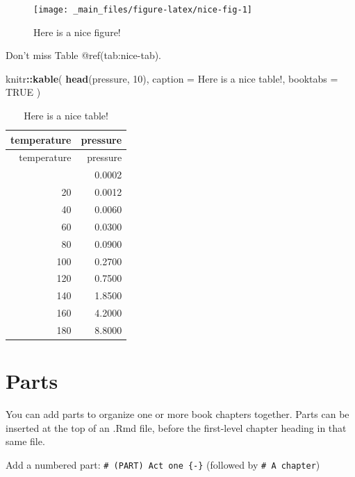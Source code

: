 \documentclass[
]{book}
\newenvironment{Shaded}{\begin{snugshade}}{\end{snugshade}}
\newcommand{\AttributeTok}[1]{\textcolor[rgb]{0.13,0.29,0.53}{#1}}
\newcommand{\ConstantTok}[1]{\textcolor[rgb]{0.56,0.35,0.01}{#1}}
\newcommand{\DecValTok}[1]{\textcolor[rgb]{0.00,0.00,0.81}{#1}}
\newcommand{\FunctionTok}[1]{\textcolor[rgb]{0.13,0.29,0.53}{\textbf{#1}}}
\newcommand{\NormalTok}[1]{#1}
\newcommand{\SpecialCharTok}[1]{\textcolor[rgb]{0.81,0.36,0.00}{\textbf{#1}}}
\newcommand{\StringTok}[1]{\textcolor[rgb]{0.31,0.60,0.02}{#1}}
\begin{document}
\begin{figure}

{\centering \texttt{[image: \_main\_files/figure-latex/nice-fig-1]} 

}

\caption{Here is a nice figure!}\label{fig:nice-fig}
\end{figure}

Don't miss Table @ref(tab:nice-tab).

\begin{Shaded}
\begin{Highlighting}[]
\NormalTok{knitr}\SpecialCharTok{::}\FunctionTok{kable}\NormalTok{(}
  \FunctionTok{head}\NormalTok{(pressure, }\DecValTok{10}\NormalTok{), }\AttributeTok{caption =} \StringTok{\textquotesingle{}Here is a nice table!\textquotesingle{}}\NormalTok{,}
  \AttributeTok{booktabs =} \ConstantTok{TRUE}
\NormalTok{)}
\end{Highlighting}
\end{Shaded}

\begin{longtable}[]{@{}rr@{}}
\caption{Here is a nice table!}\tabularnewline
\toprule\noalign{}
temperature & pressure \\
\midrule\noalign{}
\endfirsthead
\toprule\noalign{}
temperature & pressure \\
\midrule\noalign{}
\endhead
\bottomrule\noalign{}
\endlastfoot
0 & 0.0002 \\
20 & 0.0012 \\
40 & 0.0060 \\
60 & 0.0300 \\
80 & 0.0900 \\
100 & 0.2700 \\
120 & 0.7500 \\
140 & 1.8500 \\
160 & 4.2000 \\
180 & 8.8000 \\
\end{longtable}

\hypertarget{parts}{%
\chapter{Parts}\label{parts}}

You can add parts to organize one or more book chapters together. Parts
can be inserted at the top of an .Rmd file, before the first-level
chapter heading in that same file.

Add a numbered part: \texttt{\#\ (PART)\ Act\ one\ \{-\}} (followed by
\texttt{\#\ A\ chapter})
\end{document}
